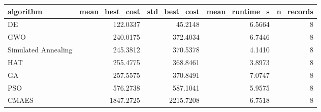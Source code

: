 \begin{tabular}{lrrrr}
\toprule
algorithm & mean_best_cost & std_best_cost & mean_runtime_s & n_records \\
\midrule
DE & 122.0337 & 45.2148 & 6.5664 & 8 \\
GWO & 240.0175 & 372.4034 & 6.7446 & 8 \\
Simulated Annealing & 245.3812 & 370.5378 & 4.1410 & 8 \\
HAT & 255.4775 & 368.8461 & 3.8973 & 8 \\
GA & 257.5575 & 370.8491 & 7.0747 & 8 \\
PSO & 576.2738 & 587.1041 & 5.9575 & 8 \\
CMAES & 1847.2725 & 2215.7208 & 6.7518 & 8 \\
\bottomrule
\end{tabular}
